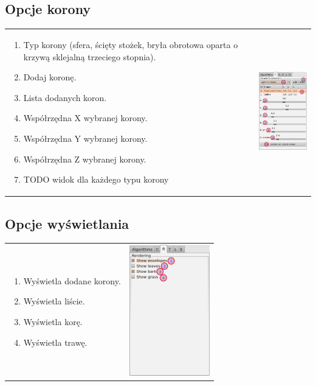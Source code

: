 \subsection{Opcje korony}
\begin{tabular}{lr}
\parbox[b]{95mm}{
\begin{enumerate}
	\item {Typ korony (sfera, ścięty stożek, bryła obrotowa oparta o krzywą sklejalną trzeciego stopnia).}
	\item {Dodaj koronę.}
	\item {Lista dodanych koron.}
	\item {Współrzędna X wybranej korony.}
	\item {Współrzędna Y wybranej korony.}
	\item {Współrzędna Z wybranej korony.}
	\item {TODO widok dla każdego typu korony}
\end{enumerate}
} &
\includegraphics[width=35mm]{images/gui/crown_panel.png} \\
\end{tabular}


\subsection{Opcje wyświetlania}
\begin{tabular}{lr}
\parbox[b]{95mm}{
\begin{enumerate}
	\item {Wyświetla dodane korony.}
	\item {Wyświetla liście.}
	\item {Wyświetla korę.}
	\item {Wyświetla trawę.}
\end{enumerate}
} &
\includegraphics[width=35mm]{images/gui/rendering_panel.png}\\
\end{tabular}

